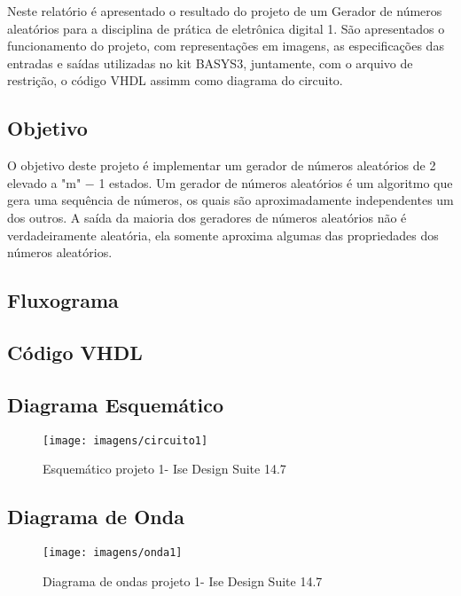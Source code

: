 \documentclass[12pts]{article}
\begin{document}
	Neste relatório é apresentado o resultado do projeto de um Gerador de números aleatórios para a disciplina de prática de eletrônica digital 1. São apresentados o funcionamento do projeto, com representações em imagens, as especificações das entradas e saídas utilizadas no kit BASYS3, juntamente, com o arquivo de restrição, o código VHDL assimm como diagrama do circuito. 

\singlespacing

\subsection{Objetivo}
	O objetivo deste projeto é implementar um gerador de números aleatórios de 2 elevado a "m" − 1 estados.	Um gerador de números aleatórios é um algoritmo que gera uma sequência de números, os quais são aproximadamente independentes um dos outros. A saída da maioria dos geradores de números
aleatórios não é verdadeiramente aleatória, ela somente aproxima algumas das propriedades dos
números aleatórios.
	
\subsection{Fluxograma}

\clearpage
\subsection{Código VHDL}


\clearpage
\subsection{Diagrama Esquemático}
\begin{figure}[!htb]
  \centering
  \texttt{[image: imagens/circuito1]}
  \caption{Esquemático projeto 1- Ise Design Suite 14.7}	
  \label{figRotulo}
\end{figure}

\newpage
\subsection{Diagrama de Onda}

\begin{figure}[!htb]
  \centering
  \texttt{[image: imagens/onda1]}
  \caption{Diagrama de ondas projeto 1- Ise Design Suite 14.7}
  \label{figRotulo}
\end{figure}
\newpage
\end{document}
